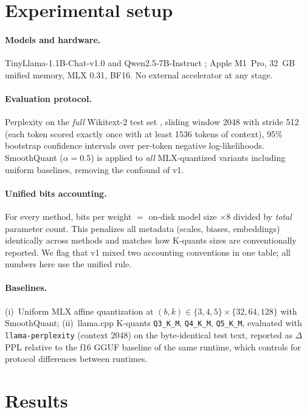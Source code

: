 \documentclass{article}
\begin{document}
\section{Experimental setup}
\label{sec:setup}

\paragraph{Models and hardware.}
TinyLlama-1.1B-Chat-v1.0 \citep{tinyllama} and Qwen2.5-7B-Instruct
\citep{qwen25}; Apple M1~Pro, 32~GB unified memory, MLX \citep{mlx} 0.31,
BF16. No external accelerator at any stage.

\paragraph{Evaluation protocol.}
Perplexity on the \emph{full} Wikitext-2 test set \citep{wikitext},
sliding window 2048 with stride 512 (each token scored exactly once with at
least 1536 tokens of context), 95\% bootstrap confidence intervals over
per-token negative log-likelihoods. SmoothQuant \citep{smoothquant}
($\alpha{=}0.5$) is applied to \emph{all} MLX-quantized variants including
uniform baselines, removing the confound of v1.

\paragraph{Unified bits accounting.}
For every method, bits per weight $=$ on-disk model size $\times 8$ divided
by \emph{total} parameter count. This penalizes all metadata (scales,
biases, embeddings) identically across methods and matches how K-quants
sizes are conventionally reported. We flag that v1 mixed two accounting
conventions in one table; all numbers here use the unified rule.

\paragraph{Baselines.}
(i)~Uniform MLX affine quantization at $(b,k) \in \{3,4,5\} \times
\{32,64,128\}$ with SmoothQuant; (ii)~llama.cpp K-quants
\citep{llamacpp} \texttt{Q3\_K\_M}, \texttt{Q4\_K\_M}, \texttt{Q5\_K\_M},
evaluated with \texttt{llama-perplexity} (context 2048) on the byte-identical
test text, reported as $\Delta$PPL relative to the f16 GGUF baseline of the
same runtime, which controls for protocol differences between runtimes.

\section{Results}
\label{sec:results}
\end{document}
